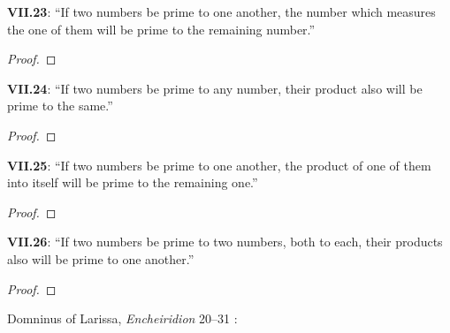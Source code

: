 \documentclass{article}
\begin{document}
\textbf{VII.23}: ``If two numbers be prime to one another, the number which measures the one of them will be prime to the remaining number.''

\begin{proof}


\end{proof}



\textbf{VII.24}: ``If two numbers be prime to any number, their product also
will be prime to the same.''

\begin{proof}


\end{proof}




\textbf{VII.25}: ``If two numbers be prime to one another, the product of one
of them into itself will be prime to the remaining one.''

\begin{proof}


\end{proof}


\textbf{VII.26}: ``If two numbers be prime to two numbers, both to each, their
products also will be prime to one another.''

\begin{proof}


\end{proof}




Domninus of Larissa, {\em Encheiridion} 20--31  \cite[pp.~111--115]{domninus}:
\end{document}
